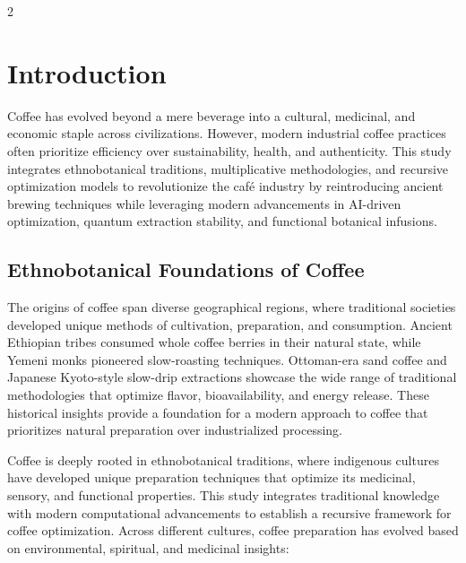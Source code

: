 \documentclass{article}
\theoremstyle{plain}
\theoremstyle{claimstyle}
\begin{document}
 \begin{multicols}{2}
\begin{singlespace}
\tableofcontents
\end{singlespace}
\end{multicols}
 \newpage

\section{Introduction}

Coffee has evolved beyond a mere beverage into a cultural, medicinal, and economic staple across civilizations. However, modern industrial coffee practices often prioritize efficiency over sustainability, health, and authenticity. This study integrates ethnobotanical traditions, multiplicative methodologies, and recursive optimization models to revolutionize the café industry by reintroducing ancient brewing techniques while leveraging modern advancements in AI-driven optimization, quantum extraction stability, and functional botanical infusions.

\subsection{Ethnobotanical Foundations of Coffee}
The origins of coffee span diverse geographical regions, where traditional societies developed unique methods of cultivation, preparation, and consumption. Ancient Ethiopian tribes consumed whole coffee berries in their natural state, while Yemeni monks pioneered slow-roasting techniques. Ottoman-era sand coffee and Japanese Kyoto-style slow-drip extractions showcase the wide range of traditional methodologies that optimize flavor, bioavailability, and energy release. These historical insights provide a foundation for a modern approach to coffee that prioritizes natural preparation over industrialized processing.

Coffee is deeply rooted in ethnobotanical traditions, where indigenous cultures have developed unique preparation techniques that optimize its medicinal, sensory, and functional properties. This study integrates traditional knowledge with modern computational advancements to establish a recursive framework for coffee optimization. Across different cultures, coffee preparation has evolved based on environmental, spiritual, and medicinal insights:
\end{document}
